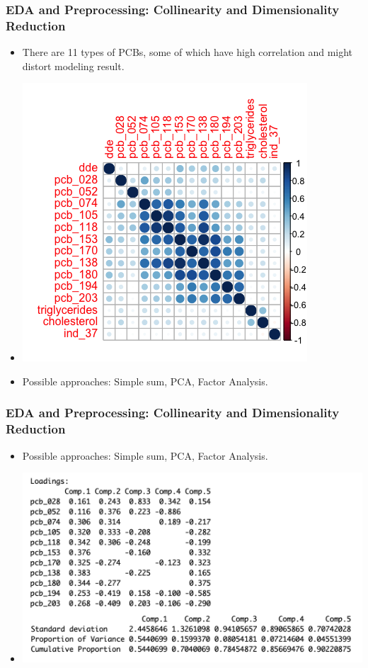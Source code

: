 \documentclass{beamer}
\begin{document}
\begin{frame}
    \frametitle{EDA and Preprocessing: Collinearity and Dimensionality Reduction}

    \begin{itemize}
        \item There are 11 types of PCBs, some of which have high correlation and might distort modeling result.
        \item  \includegraphics[scale=0.4]{corrplot.png}
        \item Possible approaches: Simple sum, PCA, Factor Analysis.
    \end{itemize}

\end{frame}

\begin{frame}
    \frametitle{EDA and Preprocessing: Collinearity and Dimensionality Reduction}

    \begin{itemize}
        \item Possible approaches: Simple sum, PCA, Factor Analysis.
        \item \includegraphics[scale=0.4]{PCA.png}


    \end{itemize}
\end{frame}
\end{document}
